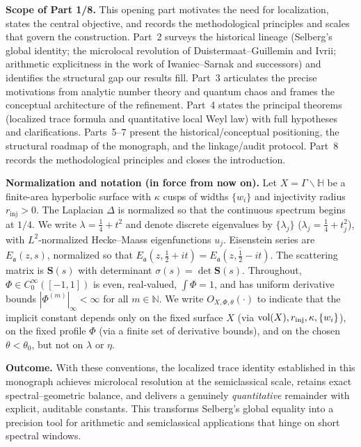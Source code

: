 \medskip

\noindent\textbf{Scope of Part 1/8.}
This opening part motivates the need for localization, states the central objective,
and records the methodological principles and scales that govern the construction.
Part~2 surveys the historical lineage (Selberg’s global identity; the microlocal
revolution of Duistermaat–Guillemin and Ivrii; arithmetic explicitness in the work
of Iwaniec–Sarnak and successors) and identifies the structural gap our results fill.
Part~3 articulates the precise motivations from analytic number theory and quantum
chaos and frames the conceptual architecture of the refinement. Part~4 states the
principal theorems (localized trace formula and quantitative local Weyl law) with
full hypotheses and clarifications. Parts~5–7 present the historical/conceptual
positioning, the structural roadmap of the monograph, and the linkage/audit protocol.
Part~8 records the methodological principles and closes the introduction.

\medskip

\noindent\textbf{Normalization and notation (in force from now on).}
Let $X=\Gamma\backslash\mathbb{H}$ be a finite-area hyperbolic surface with $\kappa$
cusps of widths $\{w_i\}$ and injectivity radius $r_{\mathrm{inj}}>0$.
The Laplacian $\Delta$ is normalized so that the continuous spectrum begins at $1/4$.
We write $\lambda=\frac14+t^2$ and denote discrete eigenvalues by $\{\lambda_j\}$
($\lambda_j=\tfrac14+t_j^2$), with $L^2$-normalized Hecke–Maass eigenfunctions $u_j$.
Eisenstein series are $E_\mathfrak{a}(z,s)$, normalized so that
$E_\mathfrak{a}(z,\tfrac12+it)=\overline{E_\mathfrak{a}(z,\tfrac12-it)}$.
The scattering matrix is $\mathbf{S}(s)$ with determinant $\sigma(s)=\det\mathbf{S}(s)$.
Throughout, $\Phi\in C_0^\infty([-1,1])$ is even, real-valued, $\int\Phi=1$, and
has uniform derivative bounds $|\Phi^{(m)}|_\infty<\infty$ for all $m\in\mathbb{N}$.
We write $O_{X,\Phi,\theta}(\cdot)$ to indicate that the implicit constant depends
only on the fixed surface $X$ (via $\operatorname{vol}(X), r_{\mathrm{inj}}, \kappa, \{w_i\}$),
on the fixed profile $\Phi$ (via a finite set of derivative bounds),
and on the chosen $\theta<\theta_0$, but not on $\lambda$ or $\eta$.

\medskip

\noindent\textbf{Outcome.}
With these conventions, the localized trace identity established in this monograph
achieves microlocal resolution at the semiclassical scale, retains exact spectral–geometric
balance, and delivers a genuinely \emph{quantitative} remainder with explicit,
auditable constants. This transforms Selberg’s global equality into a precision tool
for arithmetic and semiclassical applications that hinge on short spectral windows.

